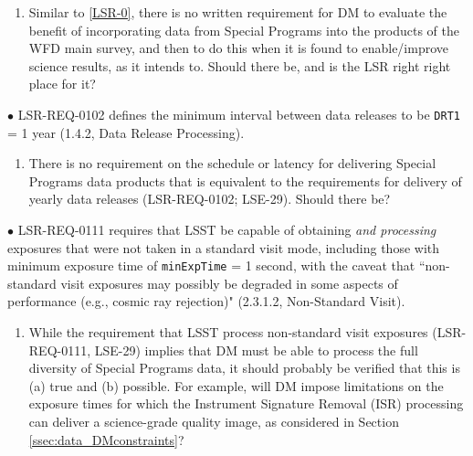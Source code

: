 \documentclass[DM,lsstdraft,toc]{lsstdoc}
\begin{document}
\begin{enumerate}[topsep=-10pt,after=\vspace{10pt},label= \textbf{Concern \Roman*.},resume] \item \label{LSR-0b} Similar to \ref{LSR-0}, there is no written requirement for DM to evaluate the benefit of incorporating data from Special Programs into the products of the WFD main survey, and then to do this when it is found to enable/improve science results, as it intends to. Should there be, and is the LSR right right place for it? \end{enumerate}

$\bullet$ LSR-REQ-0102 defines the minimum interval between data releases to be {\tt DRT1} = 1 year (1.4.2, Data Release Processing).
\begin{enumerate}[topsep=-10pt,after=\vspace{10pt},label= \textbf{Concern \Roman*.},resume] \item \label{LSR-1} There is no requirement on the schedule or latency for delivering Special Programs data products that is equivalent to the requirements for delivery of yearly data releases (LSR-REQ-0102; LSE-29). Should there be? \end{enumerate}

$\bullet$ LSR-REQ-0111 requires that LSST be capable of obtaining \textit{and processing} exposures that were not taken in a standard visit mode, including those with minimum exposure time of {\tt minExpTime} = 1 second, with the caveat that ``non-standard visit exposures may possibly be degraded in some aspects of performance (e.g., cosmic ray rejection)" (2.3.1.2, Non-Standard Visit).
\begin{enumerate}[topsep=-10pt,after=\vspace{10pt},label= \textbf{Concern \Roman*.},resume] \item \label{LSR-2} While the requirement that LSST process non-standard visit exposures (LSR-REQ-0111, LSE-29) implies that DM must be able to process the full diversity of Special Programs data, it should probably be verified that this is (a) true and (b) possible. For example, will DM impose limitations on the exposure times for which the Instrument Signature Removal (ISR) processing can deliver a science-grade quality image, as considered in Section \ref{ssec:data_DMconstraints}? \end{enumerate}
\end{document}
